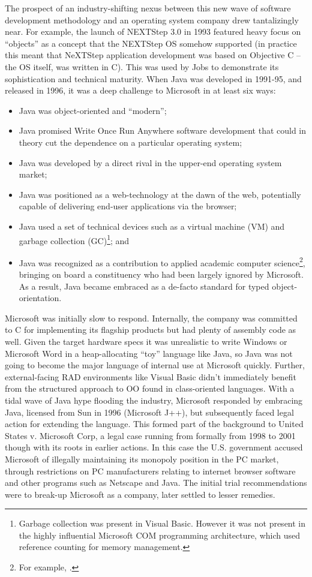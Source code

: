 \documentclass[acmsmall]{acmart}\settopmatter{}
\begin{document}
The prospect of an industry-shifting nexus between this new wave of software development methodology and an
operating system company drew tantalizingly near. For example, the launch of NEXTStep 3.0 in 1993 featured heavy
focus on “objects” as a concept that the NEXTStep OS somehow supported (in practice this meant that NeXTStep application
development was based on Objective C – the OS itself, was written in C). This was used by Jobs to demonstrate its
sophistication and technical maturity. When Java was developed in 1991-95, and released in 1996, it was a deep challenge to Microsoft in at least six ways: 
\begin{itemize}
\item Java was object-oriented and “modern”;
\item Java promised Write Once Run Anywhere software development that could in theory cut the dependence on a particular operating system; 
\item Java was developed by a direct rival in the upper-end operating system market; 
\item Java was positioned as a web-technology at the dawn of the web, potentially capable of delivering end-user applications via the browser;
\item Java used a set of technical devices such as a virtual machine (VM) and garbage collection (GC)\footnote{ Garbage collection was present in Visual Basic. However it was not present in the highly influential Microsoft COM programming architecture, which used reference counting for memory management.};  and 
\item Java was recognized as a contribution to applied academic computer science\footnote{For example, \citep{alvesfoss99}.}, bringing on board a constituency who had been largely ignored by Microsoft. As a result, Java became embraced as a de-facto standard for typed object-orientation.
\end{itemize}

Microsoft was initially slow to respond.  Internally, the company was committed to C for implementing its
flagship products but had plenty of assembly code as well. Given the target hardware specs it was unrealistic to write
Windows or Microsoft Word in a heap-allocating “toy” language like Java, so Java was not going to become the major
language of internal use at Microsoft quickly. Further, external-facing RAD environments like Visual Basic didn’t immediately
benefit from the structured approach to OO found in class-oriented languages. With a tidal wave of Java hype flooding
the industry, Microsoft responded by embracing Java, licensed from Sun in 1996 (Microsoft J++), but subsequently faced
legal action for extending the language. This formed part of the background to United States v. Microsoft Corp, a legal case
running from formally from 1998 to 2001 though with its roots in earlier actions. In this case the U.S. government accused
Microsoft of illegally maintaining its monopoly position in the PC market, through restrictions on PC manufacturers relating to
internet browser software and other programs such as Netscape and Java. The initial trial recommendations were to break-up Microsoft as a company, later settled to lesser remedies. 
\end{document}

